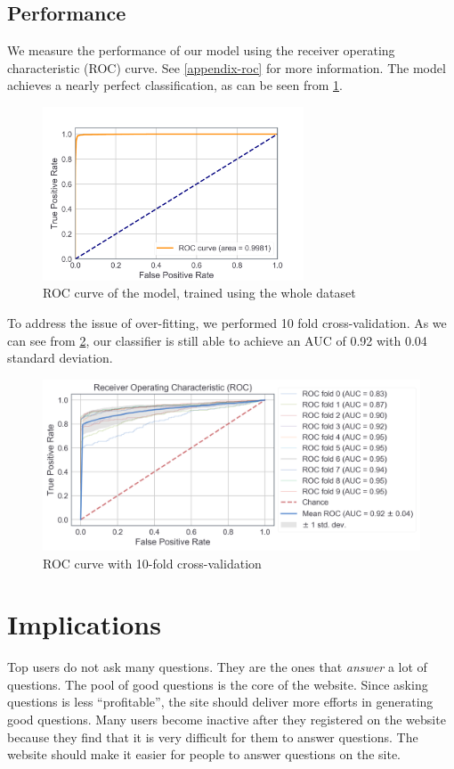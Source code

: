 \documentclass[12pt]{article}
\begin{document}
\subsection{Performance}
We measure the performance of our model using the receiver operating characteristic (ROC) curve. See \cref{appendix-roc} for more information. The model achieves a nearly perfect classification, as can be seen from \cref{roc-all}.
\begin{figure}
\centering
\includegraphics[width=0.69\textwidth]{figures/roc_standardized_features.png}
\caption{ROC curve of the model, trained using the whole dataset}
\label{roc-all}
\end{figure}
To address the issue of over-fitting, we performed 10 fold cross-validation. As we can see from \cref{10-fold}, our classifier is still able to achieve an AUC of 0.92 with 0.04 standard deviation. 
\begin{figure}
\centering
\includegraphics[width=\textwidth]{figures/roc-with-cv.png}
\caption{ROC curve with 10-fold cross-validation}
\label{10-fold}
\end{figure}

\section{Implications}
\label{implication}
\bi
\item Top users do not ask many questions. They are the ones that \emph{answer} a lot of questions. The pool of good questions is the core of the website. Since asking questions is less ``profitable'', the site should deliver more efforts in generating good questions. Many users become inactive after they registered on the website because they find that it is very difficult for them to answer questions. The website should make it easier for people to answer questions on the site.
\end{document}
